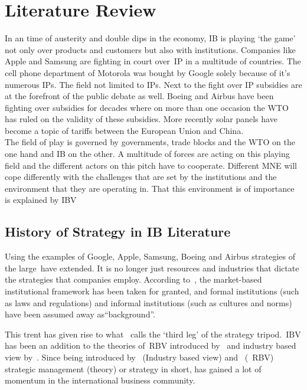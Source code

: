 \chapter{Literature Review}

In an time of austerity and double dips in the economy, \gls{IB} is playing `the game' not only over products and customers but also with institutions. Companies like Apple and Samsung are  fighting in court over~\gls{IP} in a multitude of countries. The cell phone department of Motorola was bought by Google solely because of it's numerous \glspl{IP}. The field not limited to \glspl{IP}. Next to the fight over \gls{IP} subsidies are at the forefront of the public debate as well. Boeing and Airbus have been fighting over subsidies for decades where on more than one occasion the \gls{WTO} has ruled on the validity of these subsidies. More recently solar panels have become a topic of tariffs between the European Union and China. \\

The field of play is governed by governments, trade blocks and the \gls{WTO} on the one hand and \gls{IB} on the other.
A multitude of forces are acting on this playing field and the different actors on this pitch have to cooperate. 
Different \gls{MNE} will cope differently with the challenges that are set by the institutions and the environment that they are operating in. That this environment is of importance is explained by \gls{IBV}~\cite{Kostova:1999,Meyer:2009,Wang:2012} 

\section{History of Strategy in IB Literature}
Using the examples of Google, Apple, Samsung, Boeing and Airbus strategies of the large~\mne have extended. It is no longer just resources and industries that dictate the strategies that companies employ. 
According to~\cite{Peng:2009}, the market-based institutional framework has been taken for granted, and formal institutions (such as laws and regulations) and informal institutions (such as cultures and norms) have been assumed away as``background''.

This trent has given rise to what~\cite{Peng:2009} calls the `third leg' of the strategy tripod.~\Gls{IBV} has been an addition to the theories of~\gls{RBV} introduced by~\cite{Barney:1991} and industry based view by~\cite{Porter:1980}. 
Since being introduced by~\cite{Porter:1980} (Industry based view) and~\cite{Barney:1991} (~\gls{RBV}) strategic management (theory) or strategy in short, has gained a lot of momentum in the international business community. \\ 

